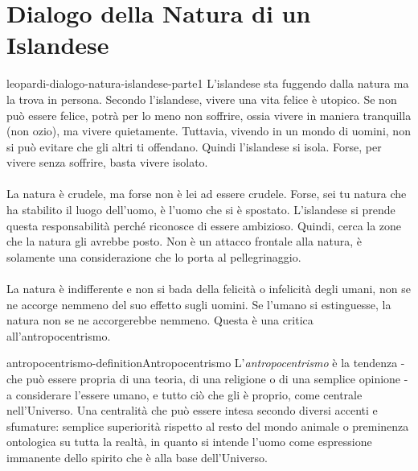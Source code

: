 \documentclass[preview]{standalone}
\begin{document}
\genpage

\section{Dialogo della Natura di un Islandese}


\begin{snippet}{leopardi-dialogo-natura-islandese-parte1}
    L'islandese sta fuggendo dalla natura ma la trova in persona.
    Secondo l'islandese, vivere una vita felice è utopico.
    Se non può essere felice, potrà per lo meno non soffrire,
    ossia vivere in maniera tranquilla (non ozio), ma vivere quietamente.
    Tuttavia, vivendo in un mondo di uomini, non si può evitare 
    che gli altri ti offendano.
    Quindi l'islandese si isola.
    Forse, per vivere senza soffrire, basta vivere isolato.
    \\\\
    La natura è crudele, ma forse non è lei ad essere crudele.
    Forse, sei tu natura che ha stabilito il luogo dell'uomo,
    è l'uomo che si è spostato. L'islandese si prende questa responsabilità perché
    riconosce di essere ambizioso. Quindi, cerca la zone che la natura gli avrebbe posto.
    Non è un attacco frontale alla natura, è solamente una considerazione
    che lo porta al pellegrinaggio.
    \\\\
    La natura è indifferente e non si bada della felicità o infelicità
    degli umani, non se ne accorge nemmeno del suo effetto sugli uomini.
    Se l'umano si estinguesse, la natura non se ne accorgerebbe nemmeno.
    Questa è una critica all'antropocentrismo.
\end{snippet}

\begin{snippetdefinition}{antropocentrismo-definition}{Antropocentrismo}
    L'\textit{antropocentrismo} è la tendenza -
    che può essere propria di una teoria, di una religione o di una semplice opinione -
    a considerare l'essere umano, e tutto ciò che gli è proprio,
    come centrale nell'Universo.
    Una centralità che può essere intesa secondo diversi accenti e sfumature:
    semplice superiorità rispetto al resto del mondo animale o preminenza ontologica su
    tutta la realtà, in quanto si intende l'uomo come espressione immanente
    dello spirito che è alla base dell'Universo. 
\end{snippetdefinition}
\end{document}
